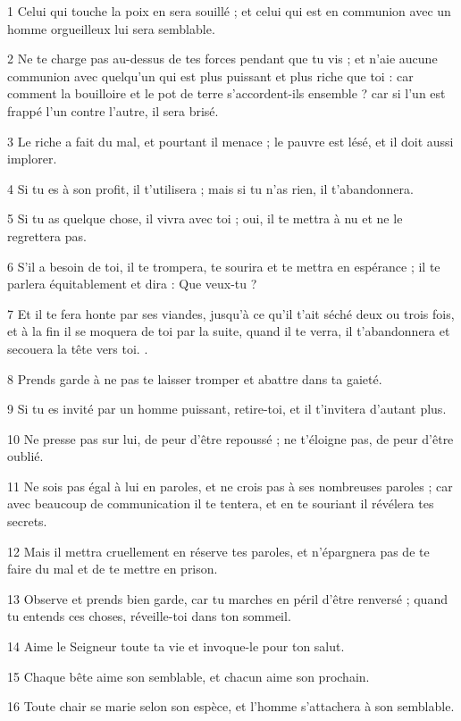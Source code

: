 
\par 1 Celui qui touche la poix en sera souillé ; et celui qui est en communion avec un homme orgueilleux lui sera semblable.
\par 2 Ne te charge pas au-dessus de tes forces pendant que tu vis ; et n'aie aucune communion avec quelqu'un qui est plus puissant et plus riche que toi : car comment la bouilloire et le pot de terre s'accordent-ils ensemble ? car si l'un est frappé l'un contre l'autre, il sera brisé.
\par 3 Le riche a fait du mal, et pourtant il menace ; le pauvre est lésé, et il doit aussi implorer.
\par 4 Si tu es à son profit, il t'utilisera ; mais si tu n'as rien, il t'abandonnera.
\par 5 Si tu as quelque chose, il vivra avec toi ; oui, il te mettra à nu et ne le regrettera pas.
\par 6 S'il a besoin de toi, il te trompera, te sourira et te mettra en espérance ; il te parlera équitablement et dira : Que veux-tu ?
\par 7 Et il te fera honte par ses viandes, jusqu'à ce qu'il t'ait séché deux ou trois fois, et à la fin il se moquera de toi par la suite, quand il te verra, il t'abandonnera et secouera la tête vers toi. .
\par 8 Prends garde à ne pas te laisser tromper et abattre dans ta gaieté.
\par 9 Si tu es invité par un homme puissant, retire-toi, et il t'invitera d'autant plus.
\par 10 Ne presse pas sur lui, de peur d'être repoussé ; ne t'éloigne pas, de peur d'être oublié.
\par 11 Ne sois pas égal à lui en paroles, et ne crois pas à ses nombreuses paroles ; car avec beaucoup de communication il te tentera, et en te souriant il révélera tes secrets.
\par 12 Mais il mettra cruellement en réserve tes paroles, et n'épargnera pas de te faire du mal et de te mettre en prison.
\par 13 Observe et prends bien garde, car tu marches en péril d'être renversé ; quand tu entends ces choses, réveille-toi dans ton sommeil.
\par 14 Aime le Seigneur toute ta vie et invoque-le pour ton salut.
\par 15 Chaque bête aime son semblable, et chacun aime son prochain.
\par 16 Toute chair se marie selon son espèce, et l'homme s'attachera à son semblable.

